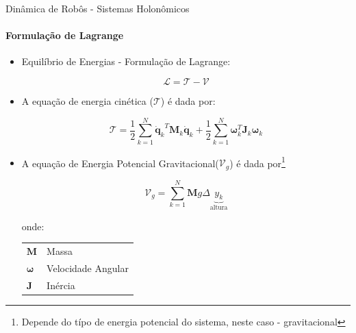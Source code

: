 \documentclass{beamer}
\begin{document}
\begin{frame}{Dinâmica de Robôs - Sistemas Holonômicos}
    \framesubtitle{Formulação de Lagrange}

    \begin{itemize}

        \item Equilíbrio de Energias - Formulação de Lagrange:

              \begin{equation}
                  \mathcal{L}= \mathcal{T} - \mathcal{V}
              \end{equation}

        \item A equação de energia cinética ($\mathcal{T}$) é dada por:

            \begin{equation}
                \mathcal{T} = \frac{1}{2} \sum\limits_{k=1}^{N}{\mathbf{\dot{q}}_k}^T  \mathbf{M}_k {\mathbf{\dot{q}}_k}+ \frac{1}{2} \sum\limits_{k=1}^{N}\mathbf{\omega}_k^T \mathbf{J}_k \mathbf{\omega}_k
            \end{equation}

        \item A equação de Energia Potencial Gravitacional($\mathcal{V}_g$) é dada por\footnote{Depende do típo de energia potencial do sistema, neste caso - gravitacional}

            \begin{equation}
                \mathcal{V}_g = \sum\limits_{k=1}^{N}\mathbf{M}g\Delta \underbrace{y_k}_{\text{altura}}
            \end{equation}  


              \begin{block}{}
                  \scriptsize{
                      onde:
                      \begin{tabular}{l|l}
                          $\mathbf{M}$               & Massa              \\
                          $\mathbf{\omega}$ & Velocidade Angular \\
                          $\mathbf{J}$               & Inércia         \\
                      \end{tabular}}
              \end{block}
    \end{itemize}
\end{frame}
\end{document}
